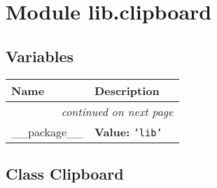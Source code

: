 %
%
%


\section{Module lib.clipboard}

    \label{lib:clipboard}


  \subsection{Variables}

    \vspace{-1cm}
\hspace{\varindent}\begin{longtable}{|p{\varnamewidth}|p{\vardescrwidth}|l}
\cline{1-2}
\cline{1-2} \centering \textbf{Name} & \centering \textbf{Description}& \\
\cline{1-2}
\endhead\cline{1-2}\multicolumn{3}{r}{\small\textit{continued on next page}}\\\endfoot\cline{1-2}
\endlastfoot\raggedright \_\-\_\-p\-a\-c\-k\-a\-g\-e\-\_\-\_\- & \raggedright \textbf{Value:} 
{\tt \texttt{'}\texttt{lib}\texttt{'}}&\\
\cline{1-2}
\end{longtable}



\subsection{Class Clipboard}

